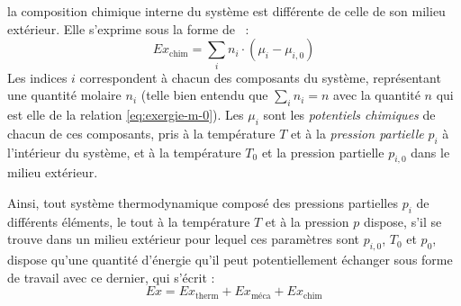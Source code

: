\documentclass[a4paper,11pt]{scrartcl}
\begin{document}
\begin{itemize}
		la composition chimique interne du système est différente de
		celle de son milieu extérieur. Elle s'exprime sous la forme
		de~\cite{TI-BE8015} : \begin{equation}
			Ex_{\text{chim}} = \sum_i n_i \cdot (\mu_i - \mu_{i,0})
		\end{equation} Les indices $i$ correspondent à chacun des
		composants du système, représentant une quantité molaire $n_i$
		(telle bien entendu que $\sum_i n_i = n$ avec la quantité $n$
		qui est elle de la relation \eqref{eq:exergie-m-0}). Les $\mu_i$
		sont les \emph{potentiels chimiques} de chacun de ces
		composants, pris à la température $T$ et à la \emph{pression
		partielle} $p_i$ à l'intérieur du système, et à la température
		$T_0$ et la pression partielle $p_{i,0}$ dans le milieu
		extérieur.
\end{itemize} Ainsi, tout système thermodynamique composé des pressions
partielles $p_i$ de différents éléments, le tout à la température $T$ et à la
pression $p$ dispose, s'il se trouve dans un milieu extérieur pour lequel ces
paramètres sont $p_{i,0}$, $T_0$ et $p_0$, dispose qu'une quantité d'énergie
qu'il peut potentiellement échanger sous forme de travail avec ce dernier, qui
s'écrit : \begin{equation}
	Ex = Ex_{\text{therm}} + Ex_{\text{méca}} + Ex_{\text{chim}}
\end{equation}

\end{document}
